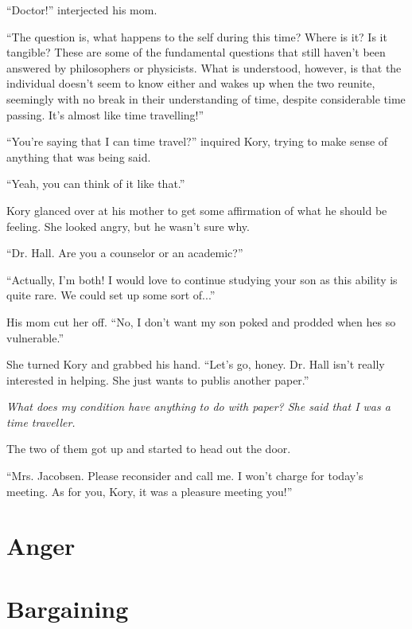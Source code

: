 \documentclass[9pt]{memoir}
\begin{document}
``Doctor!'' interjected his mom.

``The question is, what happens to the self during this time? Where is it? Is it tangible? These are some of the fundamental questions that still haven't been answered by philosophers or physicists. What is understood, however, is that the individual doesn't seem to know either and wakes up when the two reunite, seemingly with no break in their understanding of time, despite considerable time passing. It's almost like time travelling!''

``You're saying that I can time travel?'' inquired Kory, trying to make sense of anything that was being said.

``Yeah, you can think of it like that.''

Kory glanced over at his mother to get some affirmation of what he should be feeling. She looked angry, but he wasn't sure why.

``Dr. Hall. Are you a counselor or an academic?''

``Actually, I'm both! I would love to continue studying your son as this ability is quite rare. We could set up some sort of...''

His mom cut her off. ``No, I don't want my son poked and prodded when hes so vulnerable.''

She turned Kory and grabbed his hand. ``Let's go, honey. Dr. Hall isn't really interested in helping. She just wants to publis another paper.''

\textit{What does my condition have anything to do with paper? She said that I was a time traveller.}

The two of them got up and started to head out the door.

``Mrs. Jacobsen. Please reconsider and call me. I won't charge for today's meeting. As for you, Kory, it was a pleasure meeting you!''


\chapter*{Anger}



\chapter*{Bargaining}
\end{document}
